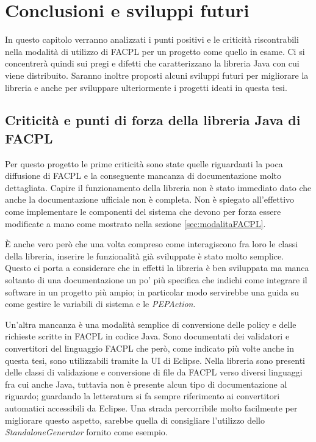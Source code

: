 
\chapter{Conclusioni e sviluppi futuri}
In questo capitolo verranno analizzati i punti positivi e le criticità riscontrabili nella modalità di utilizzo di FACPL per un progetto come quello in esame. Ci si concentrerà quindi sui pregi e difetti che caratterizzano la libreria Java con cui viene distribuito. Saranno inoltre proposti alcuni sviluppi futuri per migliorare la libreria e anche per sviluppare ulteriormente i progetti ideati in questa tesi.

\section{Criticità e punti di forza della libreria Java di FACPL}
Per questo progetto le prime criticità sono state quelle riguardanti la poca diffusione di FACPL e la conseguente mancanza di documentazione molto dettagliata. Capire il funzionamento della libreria non è stato immediato dato che anche la documentazione ufficiale non è completa. Non è spiegato all'effettivo come implementare le componenti del sistema che devono per forza essere modificate a mano come mostrato nella sezione \ref{sec:modalitaFACPL}.\par
È anche vero però che una volta compreso come interagiscono fra loro le classi della libreria, inserire le funzionalità già sviluppate è stato molto semplice. Questo ci porta a considerare che in effetti la libreria è ben sviluppata ma manca soltanto di una documentazione un po' più specifica che indichi come integrare il software in un progetto più ampio; in particolar modo servirebbe una guida su come gestire le variabili di sistema e le \emph{PEPAction}.\par
Un'altra mancanza è una modalità semplice di conversione delle policy e delle richieste scritte in FACPL in codice Java. Sono documentati dei validatori e convertitori del linguaggio FACPL che però, come indicato più volte anche in questa tesi, sono utilizzabili tramite la UI di Eclipse. Nella libreria sono presenti delle classi di validazione e conversione di file da FACPL verso diversi linguaggi fra cui anche Java, tuttavia non è presente alcun tipo di documentazione al riguardo; guardando la letteratura si fa sempre riferimento ai convertitori automatici accessibili da Eclipse. Una strada percorribile molto facilmente per migliorare questo aspetto, sarebbe quella di consigliare l'utilizzo dello \emph{StandaloneGenerator} fornito come esempio.\par
